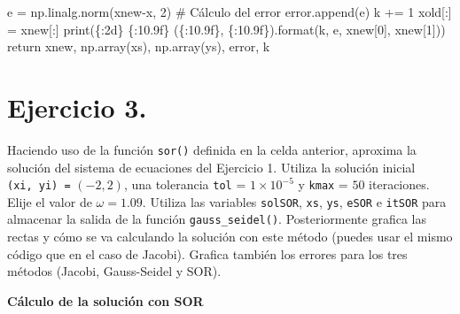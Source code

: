 \documentclass[
  letterpaper,
  DIV=11,
  numbers=noendperiod]{scrreprt}
\newenvironment{Shaded}{\begin{snugshade}}{\end{snugshade}}
\newcommand{\BuiltInTok}[1]{\textcolor[rgb]{0.00,0.23,0.31}{#1}}
\newcommand{\CommentTok}[1]{\textcolor[rgb]{0.37,0.37,0.37}{#1}}
\newcommand{\ControlFlowTok}[1]{\textcolor[rgb]{0.00,0.23,0.31}{#1}}
\newcommand{\DecValTok}[1]{\textcolor[rgb]{0.68,0.00,0.00}{#1}}
\newcommand{\NormalTok}[1]{\textcolor[rgb]{0.00,0.23,0.31}{#1}}
\newcommand{\OperatorTok}[1]{\textcolor[rgb]{0.37,0.37,0.37}{#1}}
\newcommand{\SpecialCharTok}[1]{\textcolor[rgb]{0.37,0.37,0.37}{#1}}
\newcommand{\StringTok}[1]{\textcolor[rgb]{0.13,0.47,0.30}{#1}}
\begin{document}
\begin{Shaded}
\begin{Highlighting}[]
\NormalTok{        e }\OperatorTok{=}\NormalTok{ np.linalg.norm(xnew}\OperatorTok{{-}}\NormalTok{x, }\DecValTok{2}\NormalTok{) }\CommentTok{\# Cálculo del error}
\NormalTok{        error.append(e)}
\NormalTok{        k }\OperatorTok{+=} \DecValTok{1}
\NormalTok{        xold[:] }\OperatorTok{=}\NormalTok{ xnew[:]}
        \BuiltInTok{print}\NormalTok{(}\StringTok{\textquotesingle{}}\SpecialCharTok{\{:2d\}}\StringTok{ }\SpecialCharTok{\{:10.9f\}}\StringTok{ (}\SpecialCharTok{\{:10.9f\}}\StringTok{, }\SpecialCharTok{\{:10.9f\}}\StringTok{)\textquotesingle{}}\NormalTok{.}\BuiltInTok{format}\NormalTok{(k, e, xnew[}\DecValTok{0}\NormalTok{], xnew[}\DecValTok{1}\NormalTok{]))}
    \ControlFlowTok{return}\NormalTok{ xnew, np.array(xs), np.array(ys), error, k}
\end{Highlighting}
\end{Shaded}

\section{\texorpdfstring{\textbf{Ejercicio
3.}}{Ejercicio 3.}}\label{ejercicio-3.}

Haciendo uso de la función \texttt{sor()} definida en la celda anterior,
aproxima la solución del sistema de ecuaciones del Ejercicio 1. Utiliza
la solución inicial \texttt{(xi,\ yi)\ =} \((-2, 2)\), una tolerancia
\texttt{tol} = \(1 \times 10^{-5}\) y \texttt{kmax} = \(50\)
iteraciones. Elije el valor de \(\omega = 1.09\). Utiliza las variables
\texttt{solSOR}, \texttt{xs}, \texttt{ys}, \texttt{eSOR} e
\texttt{itSOR} para almacenar la salida de la función
\texttt{gauss\_seidel()}. Posteriormente grafica las rectas y cómo se va
calculando la solución con este método (puedes usar el mismo código que
en el caso de Jacobi). Grafica también los errores para los tres métodos
(Jacobi, Gauss-Seidel y SOR).

\textbf{Cálculo de la solución con SOR}
\end{document}
